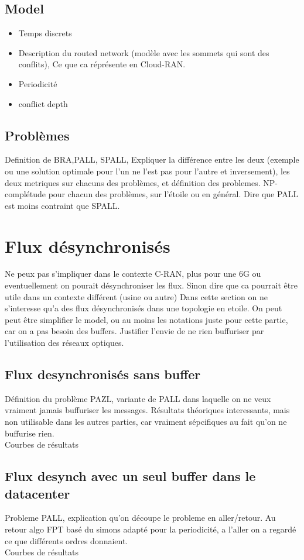 \documentclass[a4paper,10pt]{article}
\begin{document}
\subsection{Model}
\begin{itemize}
 \item Temps discrets
 \item Description du routed network (modèle avec les sommets qui sont des conflits), Ce que ca réprésente en Cloud-RAN.
 \item Periodicité
 \item conflict depth
 
\end{itemize}
\subsection{Problèmes}
Definition de BRA,PALL, SPALL, Expliquer la différence entre les deux (exemple ou une solution optimale pour l'un ne l'est pas pour l'autre et inversement), les deux metriques sur chacuns des problèmes, et définition des problemes. NP-complétude pour chacun des problèmes, sur l'étoile ou en général.
Dire que PALL est moins contraint que SPALL.

 
\section{Flux désynchronisés}
Ne peux pas s'impliquer dans le contexte C-RAN, plus pour une 6G ou eventuellement on pourait désynchroniser les flux. Sinon dire que ca pourrait être utile dans un contexte différent (usine ou autre)
Dans cette section on ne s'interesse qu'a des flux désynchronisés dans une topologie en etoile.
On peut peut être simplifier le model, ou au moins les notations juste pour cette partie, car on a pas besoin  des buffers.
Justifier l'envie de ne rien buffuriser par l'utilisation des réseaux optiques.
\subsection{Flux desynchronisés sans buffer}
Définition du problème PAZL, variante de PALL dans laquelle on ne veux vraiment jamais buffuriser les messages.
Résultats théoriques interessants, mais non utilisable dans les autres parties, car vraiment sépcifiques au fait qu'on ne buffurise rien.\\
Courbes de résultats
\subsection{Flux desynch avec un seul buffer dans le datacenter}
Probleme PALL, explication qu'on découpe le probleme en aller/retour.
Au retour algo FPT basé du simons adapté pour la periodicité, a l'aller on a regardé ce que différents ordres donnaient.\\
Courbes de résultats
\end{document}
